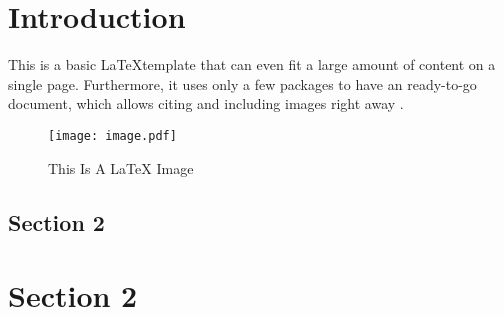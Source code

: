 \section{Introduction}

This is a basic \LaTeX template that can even fit a large amount of content on a single page. Furthermore, it uses only a few packages to have an ready-to-go document, which allows citing and including images right away \cite{auth9999title}.

\lipsum[1-2]

\begin{figure}[h]
    \texttt{[image: image.pdf]}
    \caption{This Is A \LaTeX{} Image}
\end{figure}

\subsection{Section 2}
\lipsum[3-4]

\section{Section 2}
\lipsum[5]
